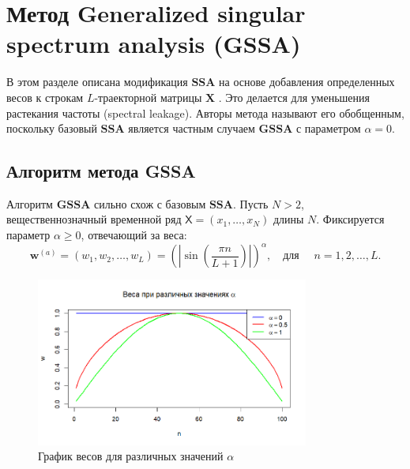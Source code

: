 \documentclass[a4paper, 11pt]{article}
\newcommand{\SSA}{\textbf{SSA}}
\newcommand{\GSSA}{\textbf{GSSA}}
\newcommand{\TS}{\mathsf{X}}
\begin{document}
\section{Метод Generalized singular spectrum analysis (GSSA)}
\label{sec:gssa}

В этом разделе описана модификация $\SSA$ на основе добавления определенных весов к строкам $L$-траекторной матрицы $\mathbf{X}$ \cite{gu2024generalized}. Это делается для уменьшения растекания частоты (spectral leakage). Авторы метода называют его обобщенным, поскольку базовый $\SSA$ является частным случаем $\GSSA$ с параметром $\alpha = 0$.

\subsection{Алгоритм метода GSSA}
Алгоритм $\GSSA$ сильно схож с базовым $\SSA$. Пусть $N > 2$, вещественнозначный временной ряд
$\TS = (x_1, \dots, x_{N})$ длины $N$. Фиксируется параметр $\alpha \geq 0$, отвечающий за веса:
\begin{equation*}
	{\boldsymbol{w}}^{(a)} = (w_{1}, w_{2}, \ldots, w_{L}) = \left( \left| \sin\left(\frac{\pi n}{L+1}\right) \right| \right)^\alpha, \quad \text{для } \quad n = 1, 2, \dots, L.
\end{equation*}

\begin{figure}[h]
	\centering
	\includegraphics[width=0.8\textwidth]{img/weights.png} %
	\caption{График весов для различных значений \(\alpha\)} %
	\label{fig:weights} %
\end{figure}
\end{document}
